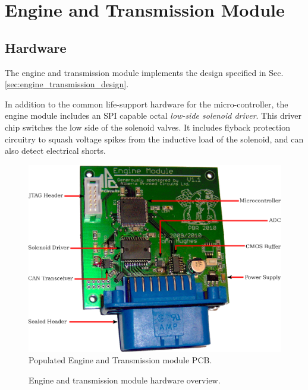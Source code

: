 \section{Engine and Transmission Module}

\subsection{Hardware}

The engine and transmission module implements the design specified in Sec. \ref{sec:engine_transmission_design}.

In addition to the common life-support hardware for the micro-controller, the engine module includes an SPI capable octal \emph{low-side solenoid driver}. This driver chip switches the low side of the solenoid valves. It includes flyback protection circuitry to squash voltage spikes from the inductive load of the solenoid, and can also detect electrical shorts. 

\begin{figure}[H]
\centering
\includegraphics[scale=1]{implementation/figures/engine_transmission_pcb}
\caption{Populated Engine and Transmission module PCB.}
\label{fig:engine_transmission_pcb}
\end{figure}

\begin{figure}[H]
\centering

\caption{Engine and transmission module hardware overview.}
\label{fig:engine_system_overmview}
\end{figure}

